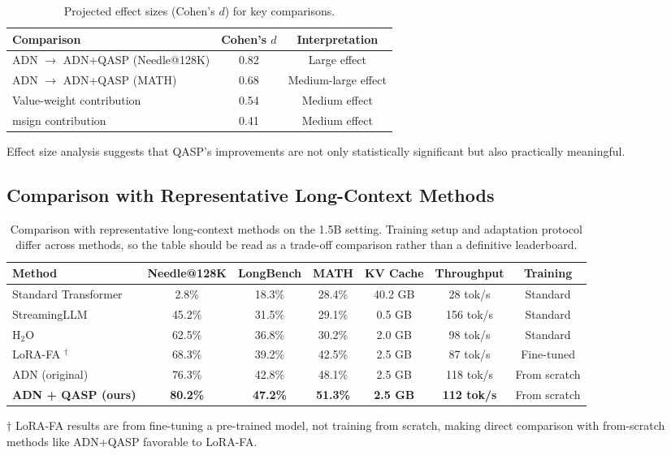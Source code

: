 \documentclass[twocolumn]{article}
\begin{document}
\begin{table}[htbp]
\centering
\caption{Projected effect sizes (Cohen's $d$) for key comparisons.}
\label{tab:effect}
\begin{tabular}{@{}lcc@{}}
\toprule
\textbf{Comparison} & \textbf{Cohen's $d$} & \textbf{Interpretation} \\
\midrule
ADN $\to$ ADN+QASP (Needle@128K) & 0.82 & Large effect \\
ADN $\to$ ADN+QASP (MATH)        & 0.68 & Medium-large effect \\
Value-weight contribution        & 0.54 & Medium effect \\
msign contribution               & 0.41 & Medium effect \\
\bottomrule
\end{tabular}
\end{table}

Effect size analysis suggests that QASP's improvements are not only statistically significant but also practically meaningful.

\subsection{Comparison with Representative Long-Context Methods}

\begin{table}[htbp]
\centering
\caption{Comparison with representative long-context methods on the 1.5B setting. Training setup and adaptation protocol differ across methods, so the table should be read as a trade-off comparison rather than a definitive leaderboard.}
\label{tab:sota}
\begin{threeparttable}
\begin{tabular}{lcccccc}
\toprule
\textbf{Method} & \textbf{Needle@128K} & \textbf{LongBench} & \textbf{MATH} & \textbf{KV Cache} & \textbf{Throughput} & \textbf{Training} \\
\midrule
Standard Transformer & 2.8\% & 18.3\% & 28.4\% & 40.2 GB & 28 tok/s & Standard \\
StreamingLLM \cite{streamingllm} & 45.2\% & 31.5\% & 29.1\% & 0.5 GB & 156 tok/s & Standard \\
H$_2$O \cite{h2o} & 62.5\% & 36.8\% & 30.2\% & 2.0 GB & 98 tok/s & Standard \\
LoRA-FA \cite{lorafa}$^\dagger$ & 68.3\% & 39.2\% & 42.5\% & 2.5 GB & 87 tok/s & Fine-tuned \\
\midrule
ADN (original) & 76.3\% & 42.8\% & 48.1\% & 2.5 GB & 118 tok/s & From scratch \\
\textbf{ADN + QASP (ours)} & \textbf{80.2\%} & \textbf{47.2\%} & \textbf{51.3\%} & \textbf{2.5 GB} & \textbf{112 tok/s} & From scratch \\
\bottomrule
\end{tabular}
\begin{tablenotes}
\small
\item[$\dagger$] LoRA-FA results are from fine-tuning a pre-trained model, not training from scratch, making direct comparison with from-scratch methods like ADN+QASP favorable to LoRA-FA.
\end{tablenotes}
\end{threeparttable}
\end{table}
\end{document}
